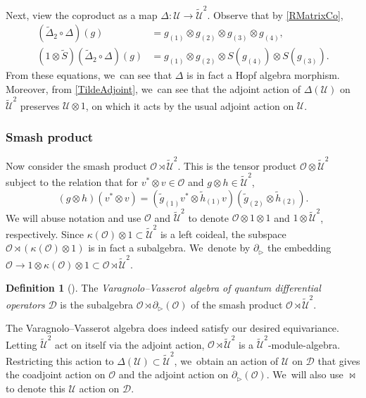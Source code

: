 \documentclass[11pt]{article}
\theoremstyle{definition}
\newtheorem{defn}[thm]{Definition}
\newcommand{\OO}{\mathcal{O}}
\newcommand{\UU}{\mathcal{U}}
\newcommand{\DD}{\mathcal{D}}
\begin{document}
Next, view the coproduct as a map $\Delta:\UU\to\widetilde{\UU}^2$.
Observe that by \eqref{RMatrixCo},\vspace*{-3pt}
\begin{align}
\nonumber
(\widetilde{\Delta}_2\circ\Delta)(g)&=g_{(1)}\otimes g_{(2)}\otimes g_{(3)}\otimes g_{(4)},\\
\label{TildeAdjoint}
(1\otimes\widetilde{S})(\widetilde{\Delta}_2\circ\Delta)(g)&=g_{(1)}\otimes g_{(2)}\otimes S(g_{(4)})\otimes S(g_{(3)}).
\end{align}
From these equations, we~can see that $\Delta$ is in fact a Hopf algebra morphism.
Moreover, from \eqref{TildeAdjoint}, we~can see that the adjoint action of $\Delta(\UU)$ on $\widetilde{\UU}^2$ preserves $\UU\otimes 1$, on which it acts by the usual adjoint action on $\UU$.

\subsubsection{Smash product}
Now consider the smash product $\OO\rtimes\widetilde{\UU}^2$.
This is the tensor product $\OO\otimes\widetilde{\UU}^2$ subject to the relation that for $v^*\otimes v\in\OO$ and $g\otimes h\in\widetilde{\UU}^2$,\vspace*{-3pt}
\begin{equation}
(g\otimes h)(v^*\otimes v)=(\tilde{g}_{(1)}v^*\otimes\tilde{h}_{(1)}v)(\tilde{g}_{(2)}\otimes\tilde{h}_{(2)}).
\label{SmashProdDef}
\end{equation}
We will abuse notation and use $\OO$ and $\widetilde{\UU}^2$ to denote $\OO\otimes 1\otimes 1$ and $1\otimes \widetilde{\UU}^2$, respectively.
Since $\kappa(\OO)\otimes 1\subset\widetilde{\UU}^2$ is a left coideal, the subspace $\OO\rtimes(\kappa(\OO)\otimes 1)$ is in fact a subalgebra. We~denote by $\partial_\triangleright$ the embedding $\OO\to1\otimes\kappa(\OO)\otimes 1\subset\OO\rtimes\widetilde{\UU}^2$.

\begin{defn}[\cite{VarVassRoot}]
The \textit{Varagnolo--Vasserot algebra of quantum differential operators} $\DD$ is the subalgebra $\OO\rtimes\partial_\triangleright(\OO)$ of the smash product $\OO\rtimes\widetilde{\UU}^2$.
\end{defn}

The Varagnolo--Vasserot algebra does indeed satisfy our desired equivariance.
Letting $\widetilde{\UU}^2$ act on itself via the adjoint action, $\OO\rtimes\widetilde{\UU}^2$ is a $\widetilde{\UU}^2$-module-algebra.
Restricting this action to $\Delta(\UU)\subset\widetilde{\UU}^2$, we~obtain an action of $\UU$ on $\DD$ that gives the coadjoint action on $\OO$ and the adjoint action on $\partial_\triangleright(\OO)$. We~will also use $\bowtie$ to denote this $\UU$ action on $\DD$.
\end{document}
